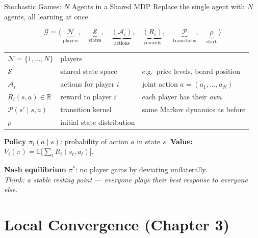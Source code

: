 \documentclass[aspectratio=169,11pt]{beamer}
\newcommand{\R}{\mathbb{R}}
\newcommand{\E}{\mathbb{E}}
\begin{document}
\begin{frame}{Stochastic Games: $N$ Agents in a Shared MDP}
  Replace the single agent with $N$ agents, all learning at once.

  \medskip

  \[
    \mathcal{G} = \langle\;
      \underbrace{\mathcal{N}}_{\text{players}},\quad
      \underbrace{\mathcal{S}}_{\text{states}},\quad
      \underbrace{(\mathcal{A}_i)}_{\text{actions}},\quad
      \underbrace{(R_i)}_{\text{rewards}},\quad
      \underbrace{\mathcal{P}}_{\text{transitions}},\quad
      \underbrace{\rho}_{\text{start}}
    \;\rangle
  \]

  \smallskip

  \begin{tabular}{@{}lll@{}}
    $\mathcal{N} = \{1,\ldots,N\}$ & players \\[4pt]
    $\mathcal{S}$ & shared state space
      & {\small e.g.\ price levels, board position} \\[4pt]
    $\mathcal{A}_i$ & actions for player $i$
      & {\small joint action $a = (a_1,\ldots,a_N)$} \\[4pt]
    $R_i(s,a)\in\R$ & reward to player $i$
      & {\small each player has their \emph{own}} \\[4pt]
    $\mathcal{P}(s'\!\mid\!s,a)$ & transition kernel
      & {\small same Markov dynamics as before} \\[4pt]
    $\rho$ & initial state distribution \\
  \end{tabular}

  \smallskip

  \textbf{Policy} $\pi_i(a\mid s)$: probability of action $a$ in state $s$.\quad
  \textbf{Value:} $V_i(\pi) = \E\bigl[\sum_t R_i(s_t,a_t)\bigr]$.

  \textbf{Nash equilibrium} $\pi^*$: no player gains by deviating unilaterally.\\
  {\small\textit{Think: a stable resting point — everyone plays their best response to everyone else.}}
\end{frame}

\section{Local Convergence (Chapter 3)}
\end{document}
